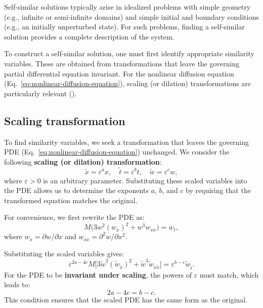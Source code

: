 \documentclass[12pt]{article}
\begin{document}
Self-similar solutions typically arise in idealized problems with simple geometry (e.g., infinite or semi-infinite domains) and simple initial and boundary conditions (e.g., an initially unperturbed state). For such problems, finding a self-similar solution provides a complete description of the system.

To construct a self-similar solution, one must first identify appropriate similarity variables. These are obtained from transformations that leave the governing partial differential equation invariant. For the nonlinear diffusion equation (Eq.~\ref{eq:nonlinear-diffusion-equation}), scaling (or dilation) transformations are particularly relevant (\cite{PakdemirliYurusoy1998, BlumanAnco2002}).
\subsection{Scaling transformation}

To find similarity variables, we seek a transformation that leaves the governing PDE (Eq.~\ref{eq:nonlinear-diffusion-equation}) unchanged. We consider the following \textbf{scaling (or dilation) transformation}:
\begin{equation*}
	\tilde{x} = \varepsilon^a x, \quad
	\tilde{t} = \varepsilon^b t, \quad
	\tilde{w} = \varepsilon^c w,
\end{equation*}
where $\varepsilon > 0$ is an arbitrary parameter. Substituting these scaled variables into the PDE allows us to determine the exponents $a$, $b$, and $c$ by requiring that the transformed equation matches the original.

For convenience, we first rewrite the PDE as:
\begin{equation*}
	M \Big(3 w^2 (w_x)^2 + w^3 w_{xx}\Big) = w_t,
\end{equation*}
where $w_x = \partial w / \partial x$ and $w_{xx} = \partial^2 w / \partial x^2$.

Substituting the scaled variables gives:
\begin{equation*}
	\varepsilon^{2a - 4c} M \Big[ 3 \tilde{w}^2 (\tilde{w}_{\tilde{x}})^2 + \tilde{w}^3 \tilde{w}_{{\tilde{x}\tilde{x}}} \Big] = \varepsilon^{b - c} \tilde{w}_{\tilde{t}}.
\end{equation*}
For the PDE to be \textbf{invariant under scaling}, the powers of $\varepsilon$ must match, which leads to:
\begin{equation}
	2a - 4c = b - c.
	\label{eq:equality-for-invariance}
\end{equation}
This condition ensures that the scaled PDE has the same form as the original.
\end{document}
